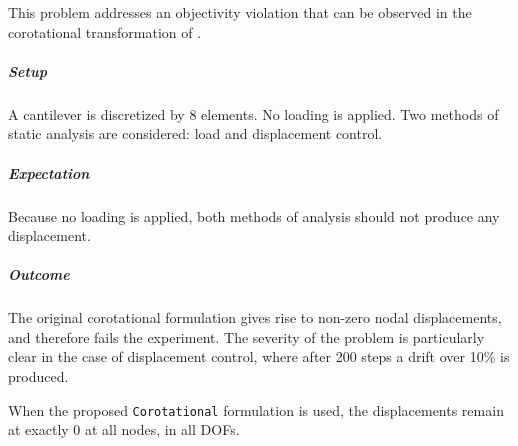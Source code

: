 
This problem addresses an objectivity violation that can be observed in the corotational transformation of \OpenSees{}.

\subparagraph{Setup}

A cantilever is discretized by 8 \ForceFrame{} elements. 
No loading is applied. 
Two methods of static analysis are considered: load and displacement control.

\subparagraph{Expectation}

Because no loading is applied, both methods of analysis should not produce any displacement.

\subparagraph{Outcome}

The original corotational formulation \citep{crisfield1990consistent} gives rise to non-zero nodal displacements,
and therefore fails the experiment. 
The severity of the problem is particularly
clear in the case of displacement control, where after 200 steps a drift over 10\% is produced.

When the proposed \texttt{Corotational} formulation is used, the displacements remain at exactly 0 at all nodes, in all DOFs.

